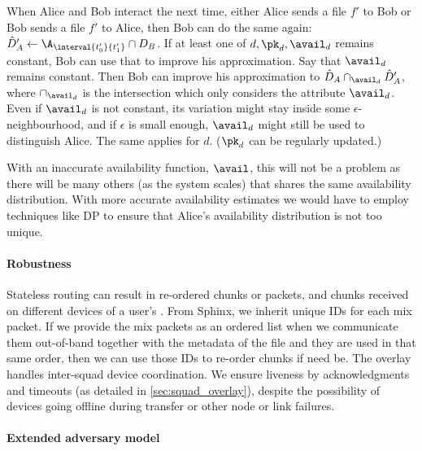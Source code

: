 When Alice and Bob interact the next time, either Alice sends a file \(f'\) to 
Bob or Bob sends a file \(f'\) to Alice, then Bob can do the same again:
\(\hat D_A' \gets \A_{\interval{t_0'}{t_1'}} \cap D_B\).
If at least one of \(d, \pk_d, \avail_d\) remains constant, Bob can use that to 
improve his approximation.
Say that \(\avail_d\) remains constant.
Then Bob can improve his approximation to \(\hat D_A \cap_{\avail_d} 
  \hat{D}_A'\), where \(\cap_{\avail_d}\) is the intersection which only 
considers the attribute \(\avail_d\).
Even if \(\avail_d\) is not constant, its variation might stay inside some 
\(\epsilon\)-neighbourhood, and if \(\epsilon\) is small enough, \(\avail_d\) 
might still be used to distinguish Alice.
The same applies for \(d\).
(\(\pk_d\) can be regularly updated.)

With an inaccurate availability function, \(\avail\), this will not be a 
problem as there will be many others (as the system scales) that shares the 
same availability distribution.
With more accurate availability estimates we would have to employ techniques 
like \ac{DP} to ensure that Alice's availability distribution is not too 
unique.

\paragraph*{Robustness}

Stateless routing can result in re-ordered chunks or packets, and
chunks received on different devices of a user's \squad. From Sphinx,
we inherit unique IDs for each mix packet.
If we provide the mix packets as an ordered list when we communicate them 
out-of-band together with the metadata of the file and they are used in that 
same order, then we can use those IDs to re-order chunks if need be.
The \squad overlay handles inter-squad  device 
coordination.
We ensure liveness by acknowledgments and timeouts (as detailed in 
\cref{sec:squad_overlay}), despite the possibility of \squad devices
going offline during transfer or other node or link failures.


\paragraph*{Extended adversary model}%
\label{security-limitations}


